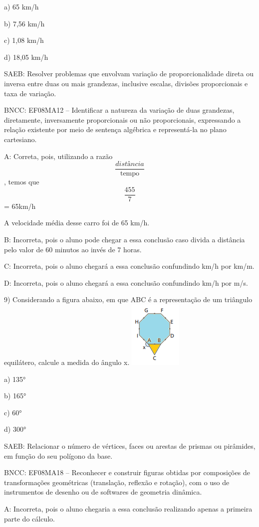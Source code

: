 a) 65 km/h

b) 7,56 km/h

c) 1,08 km/h

d) 18,05 km/h

SAEB: Resolver problemas que envolvam variação de proporcionalidade
direta ou inversa entre duas ou mais grandezas, inclusive escalas,
divisões proporcionais e taxa de variação.

BNCC: EF08MA12 -- Identificar a natureza da variação de duas grandezas,
diretamente, inversamente proporcionais ou não proporcionais,
expressando a relação existente por meio de sentença algébrica e
representá-la no plano cartesiano.

A: Correta, pois, utilizando a razão \[\frac{distância}{\text{tempo}}\],
temos que \[\frac{455}{7}\] = 65km/h

A velocidade média desse carro foi de 65 km/h.

B: Incorreta, pois o aluno pode chegar a essa conclusão caso divida a
distância pelo valor de 60 minutos ao invés de 7 horas.

C: Incorreta, pois o aluno chegará a essa conclusão confundindo km/h por
km/m.

D: Incorreta, pois o aluno chegará a essa conclusão confundindo km/h por
m/s.

9) Considerando a figura abaixo, em que ABC é a representação de um
triângulo equilátero, calcule a medida do ângulo x.
\includegraphics[width=0.98958in,height=1.26042in]{./imgSAEB_8_MAT/media/image56.png}

a) 135°

b) 165°

c) 60°

d) 300°

SAEB: Relacionar o número de vértices, faces ou arestas de prismas ou
pirâmides, em função do seu polígono da base.

BNCC: EF08MA18 -- Reconhecer e construir figuras obtidas por composições
de transformações geométricas (translação, reflexão e rotação), com o
uso de instrumentos de desenho ou de softwares de geometria dinâmica.

A: Incorreta, pois o aluno chegaria a essa conclusão realizando apenas a
primeira parte do cálculo.

